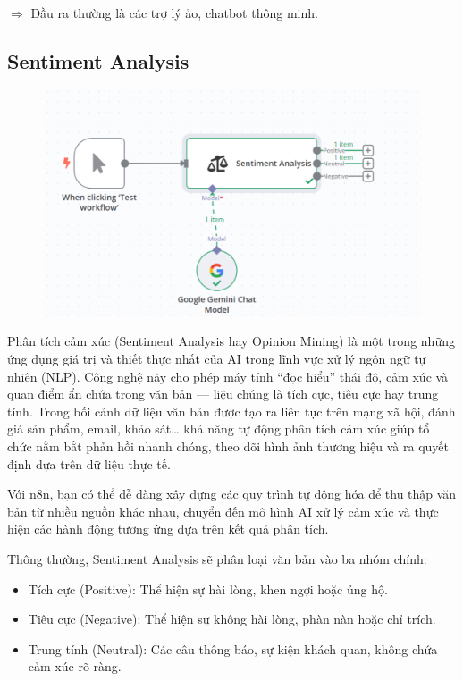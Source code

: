 $\Rightarrow$ Đầu ra thường là các trợ lý ảo, chatbot thông minh.   


\subsection{Sentiment Analysis}

\begin{figure}[htbp]
    \centering
    \includegraphics[width=1\linewidth]{Chap1-7/sentiment-node.pdf}
\end{figure}

Phân tích cảm xúc (Sentiment Analysis hay Opinion Mining) là một trong những ứng dụng giá trị và thiết thực nhất của AI trong lĩnh vực xử lý ngôn ngữ tự nhiên (NLP). Công nghệ này cho phép máy tính “đọc hiểu” thái độ, cảm xúc và quan điểm ẩn chứa trong văn bản — liệu chúng là tích cực, tiêu cực hay trung tính. Trong bối cảnh dữ liệu văn bản được tạo ra liên tục trên mạng xã hội, đánh giá sản phẩm, email, khảo sát… khả năng tự động phân tích cảm xúc giúp tổ chức nắm bắt phản hồi nhanh chóng, theo dõi hình ảnh thương hiệu và ra quyết định dựa trên dữ liệu thực tế.

Với n8n, bạn có thể dễ dàng xây dựng các quy trình tự động hóa để thu thập văn bản từ nhiều nguồn khác nhau, chuyển đến mô hình AI xử lý cảm xúc và thực hiện các hành động tương ứng dựa trên kết quả phân tích.

Thông thường, Sentiment Analysis sẽ phân loại văn bản vào ba nhóm chính:
\begin{itemize}
    \item Tích cực (Positive): Thể hiện sự hài lòng, khen ngợi hoặc ủng hộ.

    \item Tiêu cực (Negative): Thể hiện sự không hài lòng, phàn nàn hoặc chỉ trích.

    \item Trung tính (Neutral): Các câu thông báo, sự kiện khách quan, không chứa cảm xúc rõ ràng.
\end{itemize}


